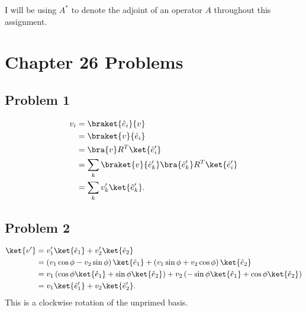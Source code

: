 \documentclass[10pt]{mypackage}
\begin{document}
\RaggedRight
I will be using $A^{\ast}$ to denote the adjoint of an operator $A$ throughout this assignment.
\section{Chapter 26 Problems}%
\subsection{Problem 1}%
\begin{align*}
  v_i &= \braket{\hat{e}_i}{v}\\
      &= \braket{v}{\hat{e}_i}\\
      &= \bra{v}R^{T}\ket{\hat{e}_i'}\\
      &= \sum_{k}\braket{v}{\hat{e}_k'}\bra{\hat{e}_k'}R^{T}\ket{\hat{e}_i'}\\
      &= \sum_{k}v_k'\ket{\hat{e}_k'}.
\end{align*}
\subsection{Problem 2}%
\begin{align*}
  \ket{v'} &= v_1'\ket{\hat{e}_1} + v_2'\ket{\hat{e}_2}\\
           &= \left(v_1\cos\phi -v_2\sin\phi\right)\ket{\hat{e}_1} + \left(v_1\sin\phi + v_2\cos\phi\right)\ket{\hat{e}_2}\\
           &= v_1\left(\cos\phi\ket{\hat{e}_1} + \sin\phi\ket{\hat{e}_2}\right) + v_2\left(-\sin\phi\ket{\hat{e}_1} + \cos\phi\ket{\hat{e}_2}\right)\\
           &= v_1\ket{\hat{e}_1'} + v_2\ket{\hat{e}_2'}.
\end{align*}
This is a clockwise rotation of the unprimed basis.
\end{document}
